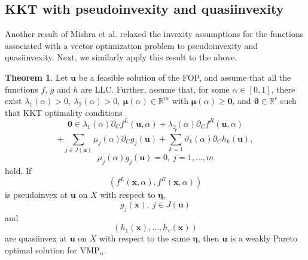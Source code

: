 \documentclass{article}
\theoremstyle{definition}
\newtheorem{theorem}[maar]{Theorem}
\begin{document}
\subsection{KKT with pseudoinvexity and quasiinvexity}
Another result of Mishra et al. \cite{MisGio} relaxed the invexity assumptions for the functions associated with a vector optimization problem to pseudoinvexity and quasiinvexity. Next, we similarly apply this result to the above.

\begin{theorem}\label{pseudoquasi} Let $\boldsymbol u$ be a feasible solution of the FOP, and assume that all the functions $f$, $g$ and $h$ are LLC. Further, assume that, for some $ \alpha \in [0,1]$, there exist $ \lambda_1( \alpha) > 0,\  \lambda_2( \alpha) > 0,\  {\boldsymbol \mu}( \alpha) \in \mathbb R^{m}$ with ${\boldsymbol \mu}( \alpha) \geq {\boldsymbol 0}$, and $ {\boldsymbol \vartheta} \in \mathbb R^r$ such that KKT optimality conditions
$$\boldsymbol 0 \in  \lambda_1( \alpha)\partial_C f^L(\boldsymbol u,  \alpha) +  \lambda_2( \alpha)\partial_C f^R(\boldsymbol u,  \alpha)$$
$$+ \sum_{j \in J(\boldsymbol{u})}  \mu_j( \alpha)\partial_Cg_j(\boldsymbol u) + \sum_{k=1}^r  \vartheta_k( \alpha)\partial_C h_k(\boldsymbol u),$$
$$ \mu_j( \alpha)g_j(\boldsymbol u) = 0,\ j=1,\dots,m$$
hold. If $$(f^L(\boldsymbol x,  \alpha), f^R(\boldsymbol x,  \alpha))$$ is pseudoinvex at $\boldsymbol u$ on $X$ with respect to $\boldsymbol \eta$, $$g_j(\boldsymbol x),\ j \in J(\boldsymbol{u})$$ and $$(h_1(\boldsymbol x),\dots,h_r(\boldsymbol x))$$ are quasiinvex at $\boldsymbol u$ on $X$ with respect to the same $\boldsymbol \eta$, then $\boldsymbol u$ is a weakly Pareto optimal solution for VMP$_\alpha$.
\end{theorem}
\end{document}
